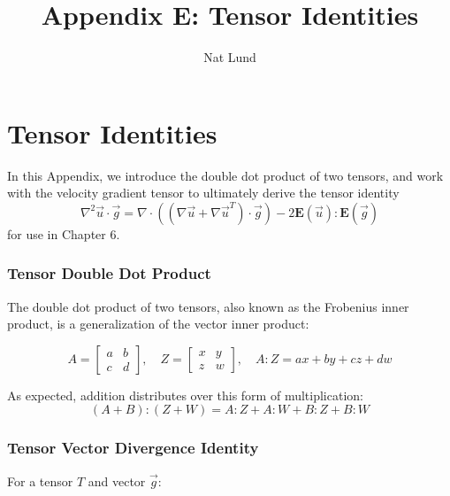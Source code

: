 \documentclass[12pt, a4paper, twoside, openright]{book}
\title{Appendix E: Tensor Identities}
\author{Nat Lund}
\begin{document}
\chapter{Tensor Identities}\label{C:tensors}

In this Appendix, we introduce the double dot product of two tensors, and work with the velocity gradient tensor to ultimately derive the tensor identity
\begin{equation*}
\nabla^2 \vec{u} \cdot \vec{g} = 
\nabla \cdot ( (\nabla \vec{u} + \nabla \vec{u}^T) \cdot \vec{g})
- 2 \mathbf{E}(\vec{u}):\mathbf{E}(\vec{g})
\end{equation*}
for use in Chapter 6.


\subsection{Tensor Double Dot Product}

The double dot product of two tensors, also known as the Frobenius inner product, is a generalization of the vector inner product:

\begin{equation}
A = 
\begin{bmatrix}
a & b \\
c & d
\end{bmatrix}
, \quad Z = 
\begin{bmatrix}
x & y \\
z & w
\end{bmatrix}
, \quad
A:Z = ax + by + cz + dw
\end{equation}

As expected, addition distributes over this form of multiplication:
\begin{equation}
(A + B):(Z + W) = A:Z + A:W + B:Z + B:W
\end{equation}

\clearpage
\subsection{Tensor Vector Divergence Identity}

For a tensor $T$ and vector $\vec{g}$:
\end{document}
